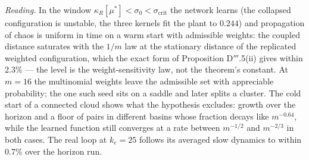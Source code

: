 \smallskip
\noindent\emph{Reading.} In the window $\kappa_R[\mu^*] < \sigma_0 < \sigma_{\mathrm{crit}}$ the network learns
(the collapsed configuration is unstable, the three kernels fit the plant to $0.244$) and propagation of chaos is
uniform in time on a warm start with admissible weights: the coupled distance saturates with the $1/m$ law at the
stationary distance of the replicated weighted configuration, which the exact form of Proposition D$'''$.5(ii) gives
within 2.3\% --- the level is the weight-sensitivity law, not the theorem's constant. At $m = 16$ the multinomial
weights leave the admissible set with appreciable probability; the one such seed sits on a saddle and later splits a
cluster. The cold start of a connected cloud shows what the hypothesis excludes: growth over the horizon and a floor
of pairs in different basins whose fraction decays like $m^{-0.64}$, while the learned function still converges at a
rate between $m^{-1/2}$ and $m^{-2/3}$ in both cases. The real loop at $k_e = 25$ follows its averaged slow dynamics
to within 0.7\% over the horizon run.

